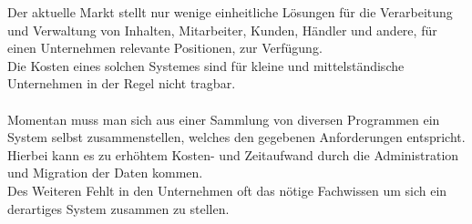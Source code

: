 Der aktuelle Markt stellt nur wenige einheitliche Lösungen für die Verarbeitung und Verwaltung von Inhalten, Mitarbeiter, Kunden, Händler und andere, für einen Unternehmen relevante Positionen, zur Verfügung.\\
Die Kosten eines solchen Systemes sind für kleine und mittelständische Unternehmen in der Regel nicht tragbar.\\
\\
Momentan muss man sich aus einer Sammlung von diversen Programmen ein System selbst zusammenstellen, welches den gegebenen Anforderungen entspricht.\\
Hierbei kann es zu erhöhtem Kosten- und Zeitaufwand durch die Administration und Migration der Daten kommen.\\
Des Weiteren Fehlt in den Unternehmen oft das nötige Fachwissen um sich ein derartiges System zusammen zu stellen.
